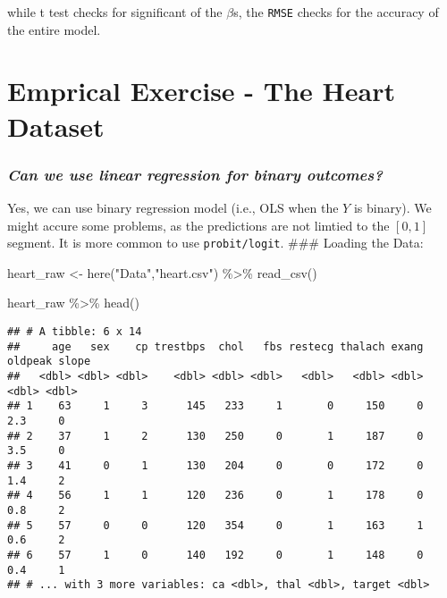 \documentclass[
]{article}
\newenvironment{Shaded}{\begin{snugshade}}{\end{snugshade}}
\newcommand{\FunctionTok}[1]{\textcolor[rgb]{0.00,0.00,0.00}{#1}}
\newcommand{\NormalTok}[1]{#1}
\newcommand{\OtherTok}[1]{\textcolor[rgb]{0.56,0.35,0.01}{#1}}
\newcommand{\SpecialCharTok}[1]{\textcolor[rgb]{0.00,0.00,0.00}{#1}}
\newcommand{\StringTok}[1]{\textcolor[rgb]{0.31,0.60,0.02}{#1}}
\begin{document}
while t test checks for significant of the \(\beta\)s, the \texttt{RMSE}
checks for the accuracy of the entire model.

\hypertarget{emprical-exercise---the-heart-dataset}{%
\section{Emprical Exercise - The Heart
Dataset}\label{emprical-exercise---the-heart-dataset}}

\hypertarget{can-we-use-linear-regression-for-binary-outcomes}{%
\subsubsection{\texorpdfstring{\emph{Can we use linear regression for
binary
outcomes?}}{Can we use linear regression for binary outcomes?}}\label{can-we-use-linear-regression-for-binary-outcomes}}

Yes, we can use binary regression model (i.e., OLS when the \(Y\) is
binary). We might accure some problems, as the predictions are not
limtied to the \([0,1]\) segment. It is more common to use
\texttt{probit/logit}. \#\#\# Loading the Data:

\begin{Shaded}
\begin{Highlighting}[]
\NormalTok{heart\_raw }\OtherTok{\textless{}{-}} 
  \FunctionTok{here}\NormalTok{(}\StringTok{"Data"}\NormalTok{,}\StringTok{"heart.csv"}\NormalTok{) }\SpecialCharTok{\%\textgreater{}\%} 
  \FunctionTok{read\_csv}\NormalTok{()}

\NormalTok{heart\_raw }\SpecialCharTok{\%\textgreater{}\%} \FunctionTok{head}\NormalTok{()}
\end{Highlighting}
\end{Shaded}

\begin{verbatim}
## # A tibble: 6 x 14
##     age   sex    cp trestbps  chol   fbs restecg thalach exang oldpeak slope
##   <dbl> <dbl> <dbl>    <dbl> <dbl> <dbl>   <dbl>   <dbl> <dbl>   <dbl> <dbl>
## 1    63     1     3      145   233     1       0     150     0     2.3     0
## 2    37     1     2      130   250     0       1     187     0     3.5     0
## 3    41     0     1      130   204     0       0     172     0     1.4     2
## 4    56     1     1      120   236     0       1     178     0     0.8     2
## 5    57     0     0      120   354     0       1     163     1     0.6     2
## 6    57     1     0      140   192     0       1     148     0     0.4     1
## # ... with 3 more variables: ca <dbl>, thal <dbl>, target <dbl>
\end{verbatim}
\end{document}
